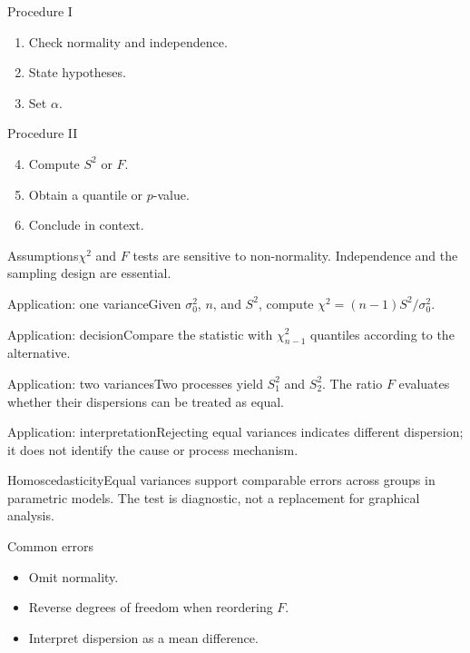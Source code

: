 \documentclass[10pt,aspectratio=169]{beamer}
\begin{document}
\begin{frame}{Procedure I}\small\begin{enumerate}\item Check normality and independence.\item State hypotheses.\item Set $\alpha$.\end{enumerate}\end{frame}
\begin{frame}{Procedure II}\small\begin{enumerate}\setcounter{enumi}{3}\item Compute $S^2$ or $F$.\item Obtain a quantile or $p$-value.\item Conclude in context.\end{enumerate}\end{frame}
\begin{frame}{Assumptions}\small $\chi^2$ and $F$ tests are sensitive to non-normality. Independence and the sampling design are essential.\end{frame}
\begin{frame}{Application: one variance}\small Given $\sigma_0^2$, $n$, and $S^2$, compute $\chi^2=(n-1)S^2/\sigma_0^2$.\end{frame}
\begin{frame}{Application: decision}\small Compare the statistic with $\chi^2_{n-1}$ quantiles according to the alternative.\end{frame}
\begin{frame}{Application: two variances}\small Two processes yield $S_1^2$ and $S_2^2$. The ratio $F$ evaluates whether their dispersions can be treated as equal.\end{frame}
\begin{frame}{Application: interpretation}\small Rejecting equal variances indicates different dispersion; it does not identify the cause or process mechanism.\end{frame}
\begin{frame}{Homoscedasticity}\small Equal variances support comparable errors across groups in parametric models. The test is diagnostic, not a replacement for graphical analysis.\end{frame}
\begin{frame}{Common errors}\small\begin{itemize}\item Omit normality.\item Reverse degrees of freedom when reordering $F$.\item Interpret dispersion as a mean difference.\end{itemize}\end{frame}
\end{document}
